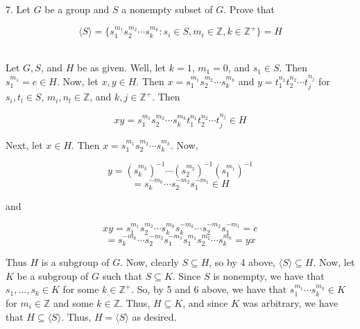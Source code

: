7. Let $G$ be a group and $S$ a nonempty subset of $G$. Prove that

$$\langle S\rangle=\{s_1^{m_1}s_2^{m_2}\cdots s_k^{m_k}:s_i\in S,m_i\in\mathbb{Z},k\in\mathbb{Z}^+\}=H$$

\begin{solution}\renewcommand{\qedsymbol}{}\ \\
    Let $G, S$, and $H$ be as given. Well, let $k=1$, $m_1=0$, and $s_1\in S$. Then $s_1^{m_1}=e\in H$.
    Now, let $x,y\in H$. Then $x=s_1^{m_1}s_2^{m_2}\cdots s_k^{m_k}$ and
    $y=t_1^{n_1}t_2^{n_2}\cdots t_j^{n_j}$ for $s_i,t_l\in S$, $m_i,n_l\in\mathbb{Z}$, and
    $k,j\in\mathbb{Z}^+$. Then

    $$xy=s_1^{m_1}s_2^{m_2}\cdots s_k^{m_k}t_1^{n_1}t_2^{n_2}\cdots t_j^{n_j}\in H$$
    
    Next, let $x\in H$.
    Then $x=s_1^{m_1}s_2^{m_2}\cdots s_k^{m_k}$. Now,

    $$y=(s_k^{m_k})^{-1}\cdots(s_2^{m_2})^{-1}(s_1^{m_1})^{-1}$$
    $$=s_k^{-m_k}\cdots s_2^{-m_2}s_1^{-m_1}\in H$$
    
    and
    
    $$xy=s_1^{m_1}s_2^{m_2}\cdots s_k^{m_k}s_k^{-m_k}\cdots s_2^{-m_2}s_1^{-m_1}=e$$
    $$=s_k^{-m_k}\cdots s_2^{-m_2}s_1^{-m_1}s_1^{m_1}s_2^{m_2}\cdots s_k^{m_k}=yx$$
    
    Thus $H$ is a subgroup of $G$. Now, clearly $S\subseteq H$, so by 4 above,
    $\langle S\rangle\subseteq H$. Now, let $K$ be a subgroup of $G$ such that $S\subseteq K$. Since $S$
    is nonempty, we have that $s_1,...,s_k\in K$ for some $k\in\mathbb{Z}^+$. So, by 5 and 6 above, we
    have that $s_1^{m_1}\cdots s_k^{m_k}\in K$ for $m_i\in\mathbb{Z}$ and some $k\in\mathbb{Z}$. Thus,
    $H\subseteq K$, and since $K$ was arbitrary, we have that $H\subseteq\langle S\rangle$. Thus,
    $H=\langle S\rangle$ as desired.

\end{solution}